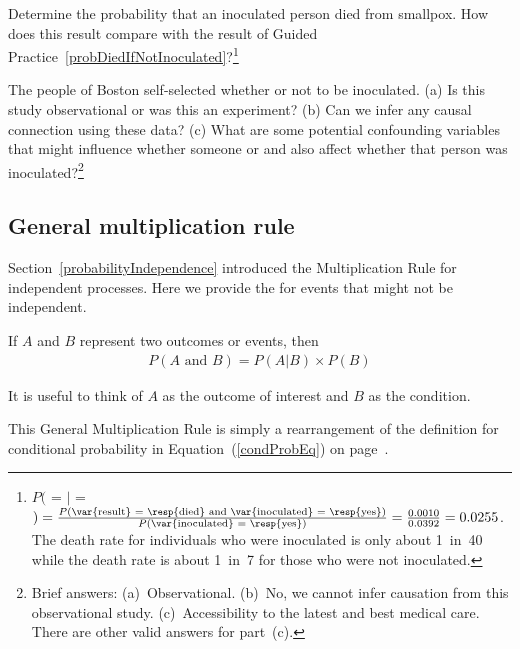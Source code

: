 \begin{exercise}
Determine the probability that an inoculated person died from smallpox. How does this result compare with the result of Guided Practice~\ref{probDiedIfNotInoculated}?\footnote{$P($ =  $|$  = $) = \frac{P(\text{\var{result} = \resp{died} and \var{inoculated} = \resp{yes}})}{P(\text{\var{inoculated} = \resp{yes}})} = \frac{0.0010}{0.0392} = 0.0255$. The death rate for individuals who were inoculated is only about 1~in~40 while the death rate is about 1~in~7 for those who were not inoculated.}
\end{exercise}

\begin{exercise}\label{SmallpoxInoculationObsExpExercise}
The people of Boston self-selected whether or not to be inoculated. (a) Is this study observational or was this an experiment? (b) Can we infer any causal connection using these data? (c) What are some potential confounding variables that might influence whether someone  or  and also affect whether that person was inoculated?\footnote{Brief answers: (a)~Observational. (b)~No, we cannot infer causation from this observational study. (c)~Accessibility to the latest and best medical care. There are other valid answers for part~(c).}
\end{exercise}

\subsection{General multiplication rule}

Section~\ref{probabilityIndependence} introduced the Multiplication Rule for independent processes. Here we provide the  for events that might not be independent.

\begin{termBox}{
If $A$ and $B$ represent two outcomes or events, then \vspace{-1.5mm}
\begin{eqnarray*}
P(A\text{ and }B) = P(A | B)\times P(B)
\end{eqnarray*} \vspace{-6.5mm} \par
It is useful to think of $A$ as the outcome of interest and $B$ as the condition.}
\end{termBox}
This General Multiplication Rule is simply a rearrangement of the definition for conditional probability in Equation~(\ref{condProbEq}) on page~\pageref{condProbEq}.

